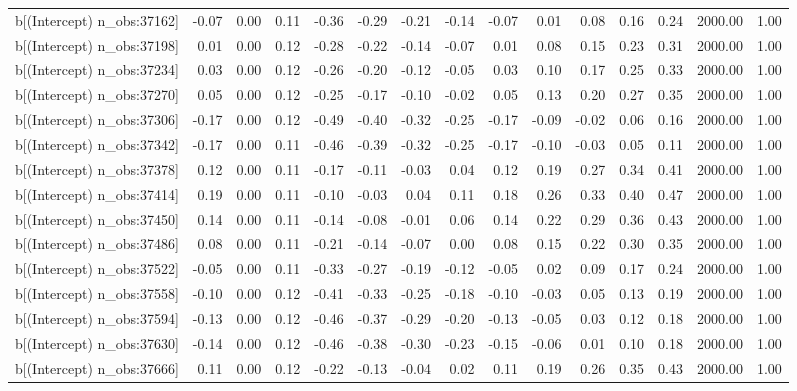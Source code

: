 \begin{table}[ht]
\begin{tabular}{rrrrrrrrrrrrrrr}
  b[(Intercept) n\_obs:37162] & -0.07 & 0.00 & 0.11 & -0.36 & -0.29 & -0.21 & -0.14 & -0.07 & 0.01 & 0.08 & 0.16 & 0.24 & 2000.00 & 1.00 \\ 
  b[(Intercept) n\_obs:37198] & 0.01 & 0.00 & 0.12 & -0.28 & -0.22 & -0.14 & -0.07 & 0.01 & 0.08 & 0.15 & 0.23 & 0.31 & 2000.00 & 1.00 \\ 
  b[(Intercept) n\_obs:37234] & 0.03 & 0.00 & 0.12 & -0.26 & -0.20 & -0.12 & -0.05 & 0.03 & 0.10 & 0.17 & 0.25 & 0.33 & 2000.00 & 1.00 \\ 
  b[(Intercept) n\_obs:37270] & 0.05 & 0.00 & 0.12 & -0.25 & -0.17 & -0.10 & -0.02 & 0.05 & 0.13 & 0.20 & 0.27 & 0.35 & 2000.00 & 1.00 \\ 
  b[(Intercept) n\_obs:37306] & -0.17 & 0.00 & 0.12 & -0.49 & -0.40 & -0.32 & -0.25 & -0.17 & -0.09 & -0.02 & 0.06 & 0.16 & 2000.00 & 1.00 \\ 
  b[(Intercept) n\_obs:37342] & -0.17 & 0.00 & 0.11 & -0.46 & -0.39 & -0.32 & -0.25 & -0.17 & -0.10 & -0.03 & 0.05 & 0.11 & 2000.00 & 1.00 \\ 
  b[(Intercept) n\_obs:37378] & 0.12 & 0.00 & 0.11 & -0.17 & -0.11 & -0.03 & 0.04 & 0.12 & 0.19 & 0.27 & 0.34 & 0.41 & 2000.00 & 1.00 \\ 
  b[(Intercept) n\_obs:37414] & 0.19 & 0.00 & 0.11 & -0.10 & -0.03 & 0.04 & 0.11 & 0.18 & 0.26 & 0.33 & 0.40 & 0.47 & 2000.00 & 1.00 \\ 
  b[(Intercept) n\_obs:37450] & 0.14 & 0.00 & 0.11 & -0.14 & -0.08 & -0.01 & 0.06 & 0.14 & 0.22 & 0.29 & 0.36 & 0.43 & 2000.00 & 1.00 \\ 
  b[(Intercept) n\_obs:37486] & 0.08 & 0.00 & 0.11 & -0.21 & -0.14 & -0.07 & 0.00 & 0.08 & 0.15 & 0.22 & 0.30 & 0.35 & 2000.00 & 1.00 \\ 
  b[(Intercept) n\_obs:37522] & -0.05 & 0.00 & 0.11 & -0.33 & -0.27 & -0.19 & -0.12 & -0.05 & 0.02 & 0.09 & 0.17 & 0.24 & 2000.00 & 1.00 \\ 
  b[(Intercept) n\_obs:37558] & -0.10 & 0.00 & 0.12 & -0.41 & -0.33 & -0.25 & -0.18 & -0.10 & -0.03 & 0.05 & 0.13 & 0.19 & 2000.00 & 1.00 \\ 
  b[(Intercept) n\_obs:37594] & -0.13 & 0.00 & 0.12 & -0.46 & -0.37 & -0.29 & -0.20 & -0.13 & -0.05 & 0.03 & 0.12 & 0.18 & 2000.00 & 1.00 \\ 
  b[(Intercept) n\_obs:37630] & -0.14 & 0.00 & 0.12 & -0.46 & -0.38 & -0.30 & -0.23 & -0.15 & -0.06 & 0.01 & 0.10 & 0.18 & 2000.00 & 1.00 \\ 
  b[(Intercept) n\_obs:37666] & 0.11 & 0.00 & 0.12 & -0.22 & -0.13 & -0.04 & 0.02 & 0.11 & 0.19 & 0.26 & 0.35 & 0.43 & 2000.00 & 1.00 \\ 

\end{tabular}
\end{table}
